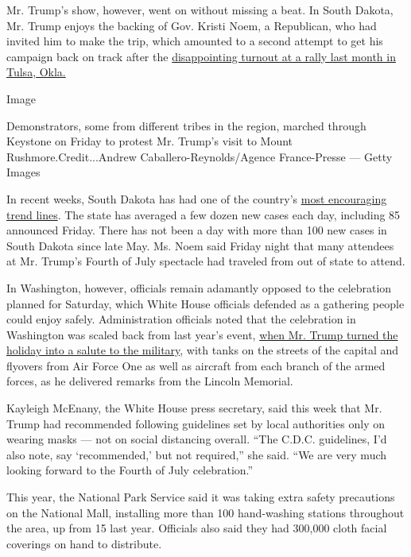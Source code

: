 Mr. Trump's show, however, went on without missing a beat. In South
Dakota, Mr. Trump enjoys the backing of Gov. Kristi Noem, a Republican,
who had invited him to make the trip, which amounted to a second attempt
to get his campaign back on track after the
\href{https://www.nytimes.com/2020/06/20/us/politics/tulsa-trump-rally.html}{disappointing
turnout at a rally last month in Tulsa, Okla.}

Image

Demonstrators, some from different tribes in the region, marched through
Keystone on Friday to protest Mr. Trump's visit to Mount
Rushmore.Credit...Andrew Caballero-Reynolds/Agence France-Presse ---
Getty Images

In recent weeks, South Dakota has had one of the country's
\href{https://www.nytimes.com/interactive/2020/us/south-dakota-coronavirus-cases.html}{most
encouraging trend lines}. The state has averaged a few dozen new cases
each day, including 85 announced Friday. There has not been a day with
more than 100 new cases in South Dakota since late May. Ms. Noem said
Friday night that many attendees at Mr. Trump's Fourth of July spectacle
had traveled from out of state to attend.

In Washington, however, officials remain adamantly opposed to the
celebration planned for Saturday, which White House officials defended
as a gathering people could enjoy safely. Administration officials noted
that the celebration in Washington was scaled back from last year's
event,
\href{https://www.nytimes.com/2019/07/02/us/politics/trump-tanks.html}{when
Mr. Trump turned the holiday into a salute to the military}, with tanks
on the streets of the capital and flyovers from Air Force One as well as
aircraft from each branch of the armed forces, as he delivered remarks
from the Lincoln Memorial.

Kayleigh McEnany, the White House press secretary, said this week that
Mr. Trump had recommended following guidelines set by local authorities
only on wearing masks --- not on social distancing overall. ``The C.D.C.
guidelines, I'd also note, say `recommended,' but not required,'' she
said. ``We are very much looking forward to the Fourth of July
celebration.''

This year, the National Park Service said it was taking extra safety
precautions on the National Mall, installing more than 100 hand-washing
stations throughout the area, up from 15 last year. Officials also said
they had 300,000 cloth facial coverings on hand to distribute.

